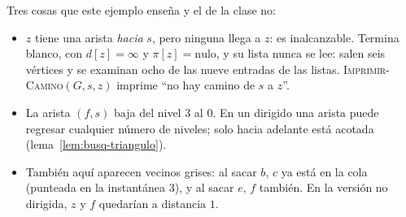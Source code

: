 \documentclass[11pt,letterpaper]{article}
\begin{document}
\begin{ejemplo}
\begin{center}
  \end{center}
  Tres cosas que este ejemplo enseña y el de la clase no:
  \begin{itemize}[itemsep=0.1em]
    \item $z$ tiene una arista \textit{hacia} $s$, pero ninguna llega
      a $z$: es inalcanzable. Termina blanco, con $d[z] = \infty$ y
      $\pi[z] = \text{nulo}$, y su lista nunca se lee: salen seis
      vértices y se examinan ocho de las nueve entradas de las
      listas. \textsc{Imprimir-Camino}$(G, s, z)$ imprime ``no hay
      camino de $s$ a $z$''.
    \item La arista $(f, s)$ baja del nivel $3$ al $0$. En un dirigido
      una arista puede regresar cualquier número de niveles; solo
      hacia adelante está acotada (lema~\ref{lem:busq-triangulo}).
    \item También aquí aparecen vecinos grises: al sacar $b$, $c$ ya
      está en la cola (punteada en la instantánea 3), y al sacar $e$,
      $f$ también. En la versión no dirigida, $z$ y $f$ quedarían a
      distancia $1$.
  \end{itemize}
\end{ejemplo}
\end{document}
